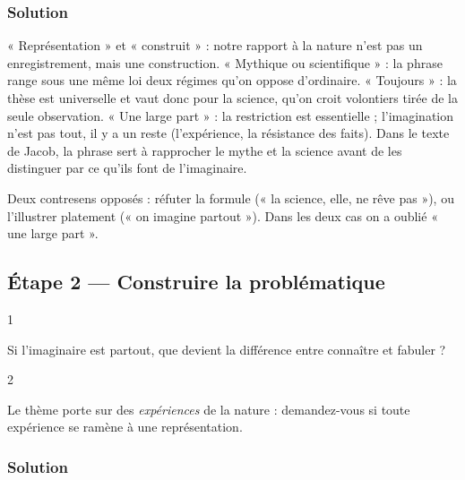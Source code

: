 \documentclass[11pt,a4paper]{article}
\begin{document}
\hypertarget{solution-4}{%
\subsubsection{Solution}\label{solution-4}}

« Représentation » et « construit » : notre rapport à la nature n'est pas un enregistrement, mais une construction. « Mythique ou scientifique » : la phrase range sous une même loi deux régimes qu'on oppose d'ordinaire. « Toujours » : la thèse est universelle et vaut donc pour la science, qu'on croit volontiers tirée de la seule observation. « Une large part » : la restriction est essentielle ; l'imagination n'est pas tout, il y a un reste (l'expérience, la résistance des faits). Dans le texte de Jacob, la phrase sert à rapprocher le mythe et la science avant de les distinguer par ce qu'ils font de l'imaginaire.

\begin{piege}

Deux contresens opposés : réfuter la formule (« la science, elle, ne rêve pas »), ou l'illustrer platement (« on imagine partout »). Dans les deux cas on a oublié « une large part ».

\end{piege}

\hypertarget{uxe9tape-2-construire-la-probluxe9matique}{%
\subsection{Étape 2 --- Construire la problématique}\label{uxe9tape-2-construire-la-probluxe9matique}}

\begin{indication}{1}

Si l'imaginaire est partout, que devient la différence entre connaître et fabuler ?

\end{indication}

\begin{indication}{2}

Le thème porte sur des \emph{expériences} de la nature : demandez-vous si toute expérience se ramène à une représentation.

\end{indication}

\hypertarget{solution-5}{%
\subsubsection{Solution}\label{solution-5}}
\end{document}
